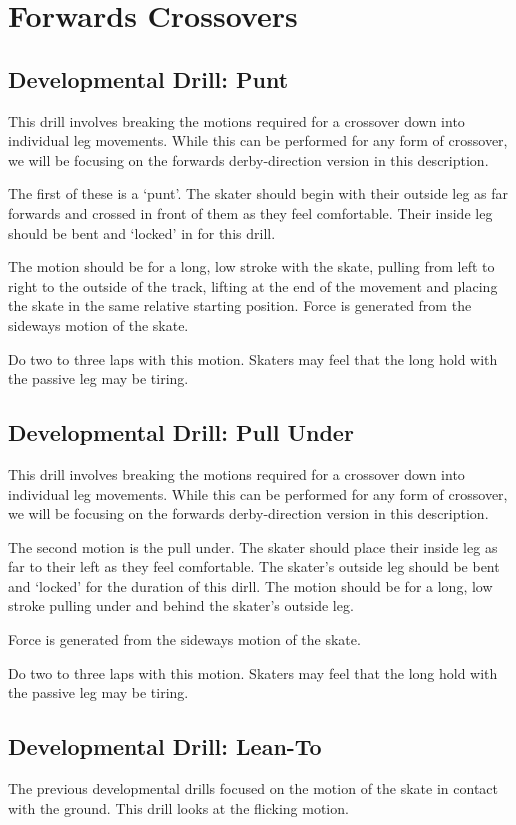 \section{Forwards Crossovers}
\label{sec:crossovers/forwards}



\subsection*{Developmental Drill: Punt}
This drill involves breaking the motions required for a crossover down into individual leg movements.
While this can be performed for any form of crossover, we will be focusing on the forwards derby-direction version in this description. 


The first of these is a `punt'. The skater should begin with their outside leg as far forwards and crossed in front of them as they feel comfortable. Their inside leg should be bent and `locked' in for this drill. 

The motion should be for a long, low stroke with the skate, pulling from left to right to the outside of the track, lifting at the end of the movement and placing the skate in the same relative starting position. 
Force is generated from the sideways motion of the skate.

Do two to three laps with this motion. 
Skaters may feel that the long hold with the passive leg may be tiring.


\subsection*{Developmental Drill: Pull Under}
This drill involves breaking the motions required for a crossover down into individual leg movements.
While this can be performed for any form of crossover, we will be focusing on the forwards derby-direction version in this description. 

The second motion is the pull under.
The skater should place their inside leg as far to their left as they feel comfortable.
The skater's outside leg should be bent and `locked' for the duration of this dirll.
The motion should be for a long, low stroke pulling under and behind the skater's outside leg.   

Force is generated from the sideways motion of the skate.

Do two to three laps with this motion. 
Skaters may feel that the long hold with the passive leg may be tiring.


\subsection*{Developmental Drill: Lean-To}
The previous developmental drills focused on the motion of the skate in contact with the ground. This drill looks at the flicking motion.     

